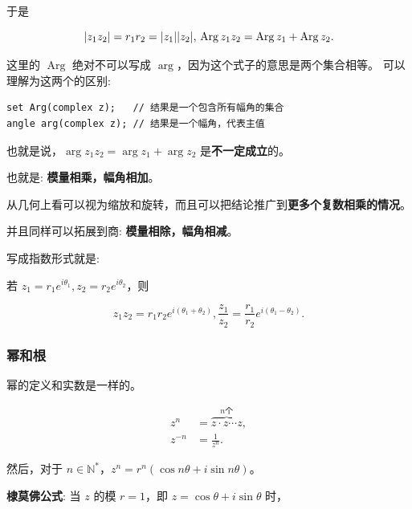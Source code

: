 于是

\begin{equation*}
|z_1z_2|=r_1r_2=|z_1||z_2|,\\
\operatorname{Arg}z_1z_2=\operatorname{Arg}z_1+\operatorname{Arg}z_2.
\end{equation*}

\begin{tcolorbox}[title={需要注意},colback=red!5!white
,colframe=red!75!black
,colbacktitle=yellow!50!red
,coltitle=red!25!black, fonttitle=\bfseries,subtitle style={boxrule=0.4pt, colback=yellow!50!red!25!white}]
这里的 \(\operatorname{Arg}\) 绝对不可以写成
\(\operatorname{arg}\)，因为这个式子的意思是两个集合相等。
可以理解为这两个的区别:

\begin{verbatim}
set Arg(complex z);   // 结果是一个包含所有幅角的集合
angle arg(complex z); // 结果是一个幅角，代表主值
\end{verbatim}

也就是说，\(\operatorname{arg}z_1z_2=\operatorname{arg}z_1+\operatorname{arg}z_2\) 是\textbf{不一定成立}的。

\end{tcolorbox}

也就是: \textbf{模量相乘，幅角相加}。

从几何上看可以视为缩放和旋转，而且可以把结论推广到\textbf{更多个复数相乘的情况}。

并且同样可以拓展到商: \textbf{模量相除，幅角相减}。

写成指数形式就是:

若 \(z_1=r_1e^{i\theta_1}, z_2=r_2e^{i\theta_2}\)，则

\begin{equation*}
z_1z_2=r_1r_2e^{i(\theta_1+\theta_2)},\frac{z_1}{z_2}=\frac{r_1}{r_2}e^{i(\theta_1-\theta_2)}.
\end{equation*}
\subsubsection{幂和根}
\label{幂和根}
幂的定义和实数是一样的。

\begin{align*}
z^n &= \overbrace{z\cdot z \cdots z}^{n\text{个}},\\
z^{-n} &= \frac{1}{z^n}.
\end{align*}

然后，对于 \(n \in \mathbb{N^*}\)，\(z^n = r^n(\cos n \theta + i \sin n \theta)\)。

\textbf{棣莫佛公式}: 当 \(z\) 的模 \(r=1\)，即 \(z=\cos\theta+i\sin\theta\) 时，

